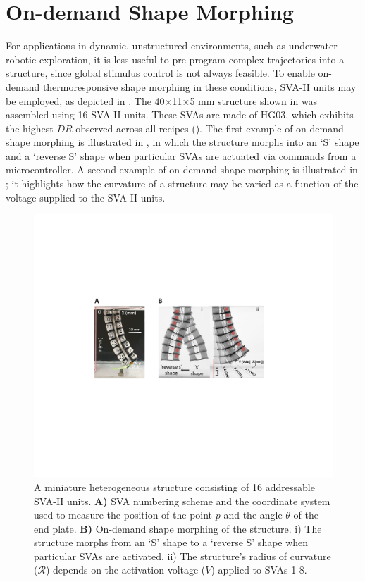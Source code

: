 \section{On-demand Shape Morphing}
For applications in dynamic, unstructured environments, such as underwater robotic exploration, it is less useful to pre-program complex trajectories into a structure, since global stimulus control is not always feasible. To enable on-demand thermoresponsive shape morphing in these conditions, SVA-II units may be employed, as depicted in . The 40×11×5 mm structure shown in  was assembled using 16 SVA-II units. These SVAs are made of HG03, which exhibits the highest $DR$ observed across all recipes (). The first example of on-demand shape morphing is illustrated in , in which the structure morphs into an `S' shape and a `reverse S' shape when particular SVAs are actuated via commands from a microcontroller. %
A second example of on-demand shape morphing is illustrated in ; it highlights how the curvature of a structure may be varied as a function of the voltage supplied to the SVA-II units.\\


\begin{figure}[!ht]
\centering
\includegraphics[width=\textwidth]{16svaArm.pdf}
\caption[A miniature soft robot consisting of 16 addressable SVA-II units]{A miniature heterogeneous structure consisting of 16 addressable SVA-II units. \textbf{A)} SVA numbering scheme and the coordinate system used to measure the position of the point $p$ and the angle $\theta$ of the end plate. \textbf{B)} On-demand shape morphing of the structure. i) The structure morphs from an `S' shape to a `reverse S' shape when particular SVAs are activated. ii) The structure's radius of curvature ($\mathcal{R}$) depends on the activation voltage ($V$) applied to SVAs 1-8.}
\label{fig:16svaArm}
\end{figure}

